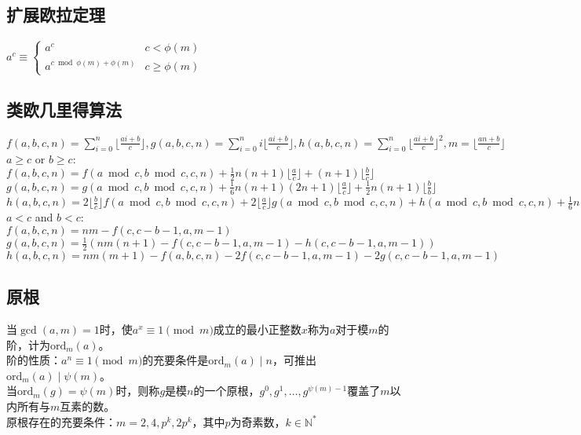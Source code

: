\newcommand{\eularian}{\genfrac\langle\rangle{0pt}{2}}
\newcommand{\Eularian}{\genfrac{\langle\!\langle}{\rangle\!\rangle}{0pt}{2}}

\subsection*{扩展欧拉定理}
    $ a^c \equiv \begin{cases} a^c & c < \phi(m) \\ a^{c \bmod \phi(m) + \phi(m)} & c \ge \phi(m) \end{cases} $

\subsection*{类欧几里得算法}
    $ f(a, b, c, n) = \sum\limits_{i=0}^n \lfloor \frac{ai + b}{c} \rfloor, g(a, b, c, n) = \sum\limits_{i=0}^n i \lfloor \frac{ai + b}{c} \rfloor, h(a, b, c, n) = \sum\limits_{i=0}^n \lfloor \frac{ai + b}{c} \rfloor ^2, m = \lfloor \frac{an + b}{c} \rfloor $
    \\$a \ge c$ or $b \ge c$:
    \\$f(a, b, c, n) = f(a \bmod c, b \bmod c, c, n) + \frac{1}{2} n (n + 1) \lfloor \frac{a}{c} \rfloor + (n + 1) \lfloor \frac{b}{c} \rfloor $
    \\$g(a, b, c, n) = g(a \bmod c, b \bmod c, c, n) + \frac{1}{6} n (n + 1) (2n + 1) \lfloor \frac{a}{c} \rfloor + \frac{1}{2} n (n + 1) \lfloor \frac{b}{b} \rfloor $
    \\$h(a, b, c, n) = 2 \lfloor \frac{b}{c} \rfloor f(a \bmod c, b \bmod c, c, n) + 2 \lfloor \frac{a}{c} \rfloor g(a \bmod c, b \bmod c, c, n) + h(a \bmod c, b \bmod c, c, n) + \frac{1}{6} n (n + 1) (2n + 1) \lfloor \frac{a}{c} \rfloor^2 + (n + 1) \lfloor \frac{b}{c} \rfloor^2 + n (n + 1) \lfloor \frac{a}{c} \rfloor \lfloor \frac{b}{c} \rfloor $
    \\$ a < c $ and $ b < c $:
    \\$ f(a, b, c, n) = nm - f(c, c - b - 1, a, m - 1) $
    \\$ g(a, b, c, n) = \frac{1}{2} (nm(n + 1) - f(c, c - b - 1, a, m - 1) - h(c, c - b - 1, a, m - 1)) $
    \\$ h(a, b, c, n) = nm(m + 1) - f(a, b, c, n) - 2f(c, c - b - 1, a, m - 1) - 2g(c, c - b - 1, a, m - 1) $

\subsection*{原根}
    当$ \gcd(a, m) = 1 $时，使$ a^x \equiv 1 \pmod m $成立的最小正整数$ x $称为$ a $对于模$ m $的阶，计为$ \text{ord}_m(a) $。
    \\阶的性质：$ a^n \equiv 1 \pmod m $的充要条件是$ \text{ord}_m(a) \mid n $，可推出$ \text{ord}_m(a) \mid \psi(m) $。
    \\当$ \text{ord}_m(g) = \psi(m) $时，则称$ g $是模$ n $的一个原根，$ g^0, g^1, \dots, g^{\psi(m) - 1} $覆盖了$ m $以内所有与$ m $互素的数。
    \\原根存在的充要条件：$ m = 2, 4, p^k, 2 p^k $，其中$ p $为奇素数，$ k \in \mathbb{N}^\ast $

